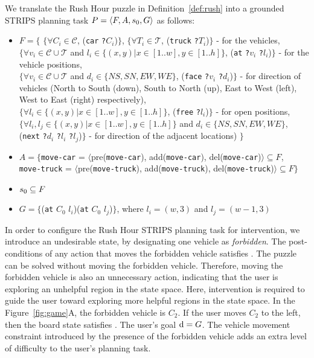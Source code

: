 We translate the Rush Hour puzzle in Definition~\ref{def:rush} into a grounded STRIPS planning task $P=\langle F, A, s_0, G\rangle$ as follows:
\begin{itemize}
\item $F=\lbrace$ 
$\lbrace \forall C_i \in \mathcal{C}$, (\texttt{car} \texttt{?}$C_i$)$\rbrace$, 
$\lbrace \forall T_i \in \mathcal{T}$, (\texttt{truck} \texttt{?}$T_i$)$\rbrace$  - for the vehicles,\\
$\lbrace \forall v_i \in \mathcal{C}\cup \mathcal{T}$ and $l_i\in \lbrace(x,y)|x\in \left[ 1..w\right ], y \in \left[ 1..h\right] \rbrace$, (\texttt{at} \texttt{?}$v_i$ \texttt{?}$l_i$)$\rbrace$ - for the vehicle positions,\\
$\lbrace \forall v_i \in \mathcal{C}\cup \mathcal{T}$ and $d_i\in \lbrace NS, SN, EW, WE \rbrace$, (\texttt{face} \texttt{?}$v_i$ \texttt{?}$d_i$)$\rbrace$ - for direction of vehicles (North to South (down), South to North (up), East to West (left), West to East (right) respectively),\\
$\lbrace \forall l_i\in \lbrace(x,y)|x\in \left[ 1..w\right ], y \in \left[ 1..h\right]\rbrace$, (\texttt{free} \texttt{?}$l_i$)$\rbrace$ - for open positions,\\
$\lbrace \forall l_i, l_j\in \lbrace(x,y)|x\in \left[ 1..w\right ], y \in \left[ 1..h\right]\rbrace$ and $d_i\in \lbrace NS, SN, EW, WE \rbrace$, (\texttt{next} \texttt{?}$d_i$ \texttt{?}$l_i$ \texttt{?}$l_j$)$\rbrace$ - for direction of the adjacent locations)
$\rbrace$

\item $A = \lbrace$\texttt{move-car} = $\langle$pre(\texttt{move-car}), add(\texttt{move-car}), del(\texttt{move-car})$\rangle \subseteq F$, \\
\texttt{move-truck} = $\langle$pre(\texttt{move-truck}), add(\texttt{move-truck}), del(\texttt{move-truck})$\rangle \subseteq F  \rbrace$
\item $s_0 \subseteq F$
\item $G = \lbrace$(\texttt{at} $C_0$ $l_i$)(\texttt{at} $C_0$ $l_j$)$\rbrace$, where $l_i=(w,3)$ and $l_j=(w-1,3)$
\end{itemize}
 
In order to configure the Rush Hour STRIPS planning task for intervention, we introduce an undesirable state, \undesired by designating one vehicle as \textit{forbidden}. 
The post-conditions of any action that moves the forbidden vehicle satisfies \undesired. 
The puzzle can be solved without moving the forbidden vehicle.
Therefore, moving the forbidden vehicle is also an unnecessary action, indicating that the user is exploring an unhelpful region in the state space.
Here, intervention is required to guide the user toward exploring more helpful regions in the state space.
In the Figure~\ref{fig:game}A, the forbidden vehicle is $C_2$. If the user moves $C_2$ to the left, then the board state satisfies \undesired.
The user's goal $\mathrm{d} = G$.
The vehicle movement constraint introduced by the presence of the forbidden vehicle adds an extra level of difficulty to the user's planning task. 

